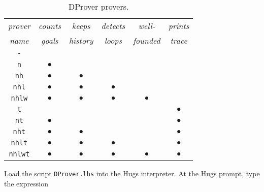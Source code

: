 \begin{table}[h]

\setMyFontSize

\centering


\begin{tabular}{|c|c|c|c|c|c|} \hline

\emph{prover} & \emph{counts} & \emph{keeps}   & \emph{detects} & \emph{well-}   & \emph{prints} \\ 
\emph{name}   & \emph{goals}  & \emph{history} & \emph{loops}   & \emph{founded} & \emph{trace}  \\ \hline
\verb"-"      &               &                &                &                &               \\ 
\verb"n"      & $\bullet$     &                &                &                &               \\ 
\verb"nh"     & $\bullet$     & $\bullet$      &                &                &               \\ 
\verb"nhl"    & $\bullet$     & $\bullet$      & $\bullet$      &                &               \\
\verb"nhlw"   & $\bullet$     & $\bullet$      & $\bullet$      & $\bullet$      &               \\
\verb"t"      &               &                &                &                & $\bullet$     \\ 
\verb"nt"     & $\bullet$     &                &                &                & $\bullet$     \\ 
\verb"nht"    & $\bullet$     & $\bullet$      &                &                & $\bullet$     \\ 
\verb"nhlt"   & $\bullet$     & $\bullet$      & $\bullet$      &                & $\bullet$     \\ 
\verb"nhlwt"  & $\bullet$     & $\bullet$      & $\bullet$      & $\bullet$      & $\bullet$     \\ \hline
\end{tabular}

\caption{\setMyFontSize\label{dProverTable}DProver 
provers.}

\end{table}



Load the script {\tt DProver.lhs} into the Hugs
interpreter. At the Hugs prompt, type the expression 

